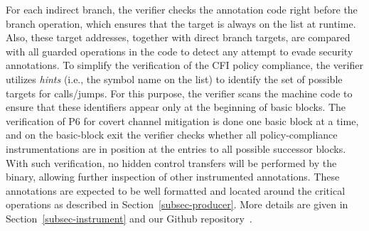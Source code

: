 For each indirect branch, the verifier checks the annotation code right before the branch operation, which ensures that the target is always on the list at runtime. Also, these target addresses, together with direct branch targets, are compared with all guarded operations in the code to detect any attempt to evade security annotations. To simplify the verification of the CFI policy compliance, the verifier utilizes \textit{hints} (i.e., the symbol  name on the list) to identify the set of possible targets for calls/jumps. For this purpose, the verifier scans the machine code  to ensure that these identifiers appear only at the beginning of basic blocks. The verification of P6 for covert channel mitigation is done one basic block at a time, and on the basic-block exit the verifier checks whether all policy-compliance instrumentations are in position at the entries to all possible successor blocks.
With such verification, no hidden control transfers will be performed by the binary, allowing further inspection of other instrumented annotations. These annotations are expected to be well formatted and located around the critical operations as described in Section~\ref{subsec-producer}. %
More details are given in Section~\ref{subsec-instrument} and our Github repository~\cite{our-prototype}.






